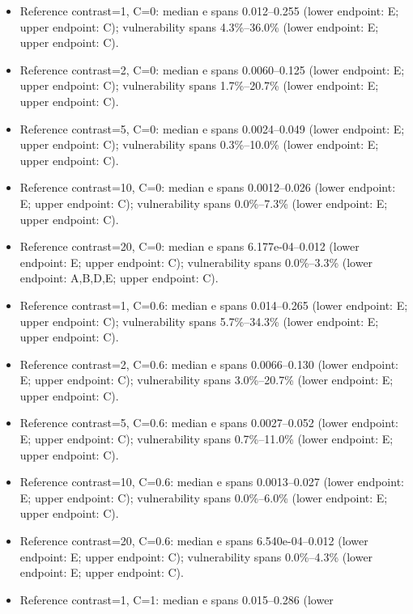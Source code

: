 \iffalse
\begin{itemize}
\tightlist
\item
  Reference contrast=1, C=0: median \textbar e\textbar{} spans 0.012--0.255 (lower
  endpoint: E; upper endpoint: C); vulnerability spans 4.3\%--36.0\%
  (lower endpoint: E; upper endpoint: C).
\item
  Reference contrast=2, C=0: median \textbar e\textbar{} spans 0.0060--0.125 (lower
  endpoint: E; upper endpoint: C); vulnerability spans 1.7\%--20.7\%
  (lower endpoint: E; upper endpoint: C).
\item
  Reference contrast=5, C=0: median \textbar e\textbar{} spans 0.0024--0.049 (lower
  endpoint: E; upper endpoint: C); vulnerability spans 0.3\%--10.0\%
  (lower endpoint: E; upper endpoint: C).
\item
  Reference contrast=10, C=0: median \textbar e\textbar{} spans 0.0012--0.026 (lower
  endpoint: E; upper endpoint: C); vulnerability spans 0.0\%--7.3\%
  (lower endpoint: E; upper endpoint: C).
\item
  Reference contrast=20, C=0: median \textbar e\textbar{} spans 6.177e-04--0.012
  (lower endpoint: E; upper endpoint: C); vulnerability spans
  0.0\%--3.3\% (lower endpoint: A,B,D,E; upper endpoint: C).
\item
  Reference contrast=1, C=0.6: median \textbar e\textbar{} spans 0.014--0.265 (lower
  endpoint: E; upper endpoint: C); vulnerability spans 5.7\%--34.3\%
  (lower endpoint: E; upper endpoint: C).
\item
  Reference contrast=2, C=0.6: median \textbar e\textbar{} spans 0.0066--0.130
  (lower endpoint: E; upper endpoint: C); vulnerability spans
  3.0\%--20.7\% (lower endpoint: E; upper endpoint: C).
\item
  Reference contrast=5, C=0.6: median \textbar e\textbar{} spans 0.0027--0.052
  (lower endpoint: E; upper endpoint: C); vulnerability spans
  0.7\%--11.0\% (lower endpoint: E; upper endpoint: C).
\item
  Reference contrast=10, C=0.6: median \textbar e\textbar{} spans 0.0013--0.027
  (lower endpoint: E; upper endpoint: C); vulnerability spans
  0.0\%--6.0\% (lower endpoint: E; upper endpoint: C).
\item
  Reference contrast=20, C=0.6: median \textbar e\textbar{} spans 6.540e-04--0.012
  (lower endpoint: E; upper endpoint: C); vulnerability spans
  0.0\%--4.3\% (lower endpoint: E; upper endpoint: C).
\item
  Reference contrast=1, C=1: median \textbar e\textbar{} spans 0.015--0.286 (lower

\end{itemize}
